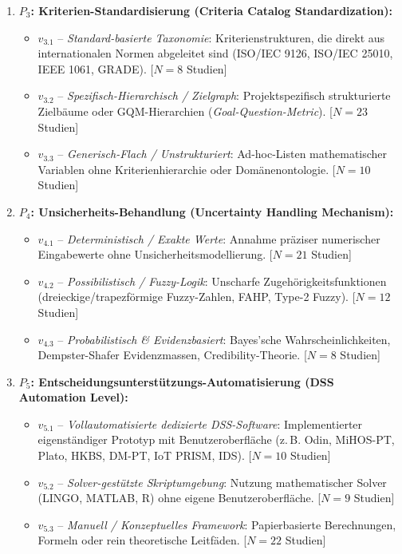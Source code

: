 \begin{enumerate}
    \item \textbf{$P_3$: Kriterien-Standardisierung (Criteria Catalog Standardization):}
    \begin{itemize}
        \item $v_{3.1}$ -- \textit{Standard-basierte Taxonomie}: Kriterienstrukturen, die direkt aus internationalen Normen abgeleitet sind (ISO/IEC 9126, ISO/IEC 25010, IEEE 1061, GRADE). [$N = 8$ Studien]
        \item $v_{3.2}$ -- \textit{Spezifisch-Hierarchisch / Zielgraph}: Projektspezifisch strukturierte Zielbäume oder GQM-Hierarchien (\textit{Goal-Question-Metric}). [$N = 23$ Studien]
        \item $v_{3.3}$ -- \textit{Generisch-Flach / Unstrukturiert}: Ad-hoc-Listen mathematischer Variablen ohne Kriterienhierarchie oder Domänenontologie. [$N = 10$ Studien]
    \end{itemize}

    \item \textbf{$P_4$: Unsicherheits-Behandlung (Uncertainty Handling Mechanism):}
    \begin{itemize}
        \item $v_{4.1}$ -- \textit{Deterministisch / Exakte Werte}: Annahme präziser numerischer Eingabewerte ohne Unsicherheitsmodellierung. [$N = 21$ Studien]
        \item $v_{4.2}$ -- \textit{Possibilistisch / Fuzzy-Logik}: Unscharfe Zugehörigkeitsfunktionen (dreieckige/trapezförmige Fuzzy-Zahlen, FAHP, Type-2 Fuzzy). [$N = 12$ Studien]
        \item $v_{4.3}$ -- \textit{Probabilistisch \& Evidenzbasiert}: Bayes'sche Wahrscheinlichkeiten, Dempster-Shafer Evidenzmassen, Credibility-Theorie. [$N = 8$ Studien]
    \end{itemize}

    \item \textbf{$P_5$: Entscheidungsunterstützungs-Automatisierung (DSS Automation Level):}
    \begin{itemize}
        \item $v_{5.1}$ -- \textit{Vollautomatisierte dedizierte DSS-Software}: Implementierter eigenständiger Prototyp mit Benutzeroberfläche (z.\,B. Odin, MiHOS-PT, Plato, HKBS, DM-PT, IoT PRISM, IDS). [$N = 10$ Studien]
        \item $v_{5.2}$ -- \textit{Solver-gestützte Skriptumgebung}: Nutzung mathematischer Solver (LINGO, MATLAB, R) ohne eigene Benutzeroberfläche. [$N = 9$ Studien]
        \item $v_{5.3}$ -- \textit{Manuell / Konzeptuelles Framework}: Papierbasierte Berechnungen, Formeln oder rein theoretische Leitfäden. [$N = 22$ Studien]
    \end{itemize}


\end{enumerate}
